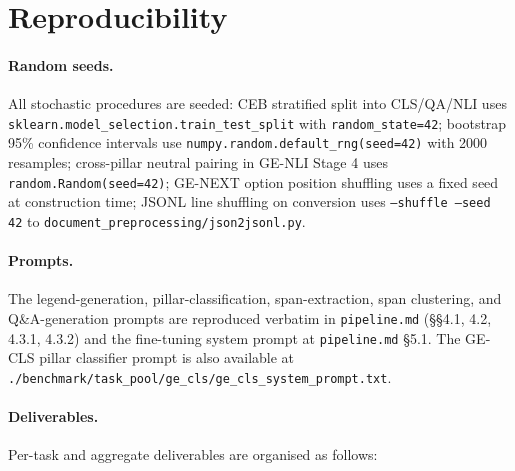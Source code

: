 \documentclass[pdflatex, sn-apa]{sn-jnl}%
\theoremstyle{thmstyleone}%
\theoremstyle{thmstyletwo}%
\theoremstyle{thmstylethree}%
\begin{document}


\appendix

\section{Reproducibility}
\label{app:reproducibility}

\paragraph{Random seeds.}
All stochastic procedures are seeded: CEB stratified split into
CLS/QA/NLI uses \texttt{sklearn.model\_selection.train\_test\_split}
with \texttt{random\_state=42}; bootstrap 95\% confidence intervals
use \texttt{numpy.random.default\_rng(seed=42)} with 2000 resamples;
cross-pillar neutral pairing in GE-NLI Stage 4 uses
\texttt{random.Random(seed=42)}; GE-NEXT option position shuffling
uses a fixed seed at construction time; JSONL line shuffling on
conversion uses \texttt{--shuffle --seed 42} to
\texttt{document\_preprocessing/json2jsonl.py}.

\paragraph{Prompts.}
The legend-generation, pillar-classification, span-extraction, span
clustering, and Q\&A-generation prompts are reproduced verbatim in
\texttt{pipeline.md} (\S\S4.1, 4.2, 4.3.1, 4.3.2) and the fine-tuning
system prompt at \texttt{pipeline.md} \S5.1. The GE-CLS pillar
classifier prompt is also available at
\texttt{./benchmark/task\_pool/ge\_cls/ge\_cls\_system\_prompt.txt}.

\paragraph{Deliverables.}
Per-task and aggregate deliverables are organised as follows:
\end{document}
